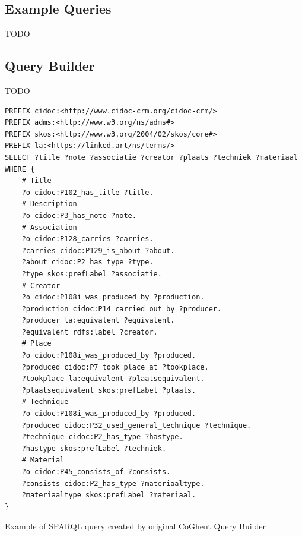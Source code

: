 \subsection{Example Queries}
\label{sec:coghent_example_queries}

TODO

\subsection{Query Builder}

TODO

\begin{listing}[htbp]
    \begin{verbatim}
PREFIX cidoc:<http://www.cidoc-crm.org/cidoc-crm/>
PREFIX adms:<http://www.w3.org/ns/adms#>
PREFIX skos:<http://www.w3.org/2004/02/skos/core#>
PREFIX la:<https://linked.art/ns/terms/>
SELECT ?title ?note ?associatie ?creator ?plaats ?techniek ?materiaal
WHERE {
    # Title
    ?o cidoc:P102_has_title ?title.
    # Description
    ?o cidoc:P3_has_note ?note.
    # Association
    ?o cidoc:P128_carries ?carries.
    ?carries cidoc:P129_is_about ?about.
    ?about cidoc:P2_has_type ?type.
    ?type skos:prefLabel ?associatie.
    # Creator
    ?o cidoc:P108i_was_produced_by ?production.
    ?production cidoc:P14_carried_out_by ?producer.
    ?producer la:equivalent ?equivalent.
    ?equivalent rdfs:label ?creator.
    # Place
    ?o cidoc:P108i_was_produced_by ?produced.
    ?produced cidoc:P7_took_place_at ?tookplace.
    ?tookplace la:equivalent ?plaatsequivalent.
    ?plaatsequivalent skos:prefLabel ?plaats.
    # Technique
    ?o cidoc:P108i_was_produced_by ?produced.
    ?produced cidoc:P32_used_general_technique ?technique.
    ?technique cidoc:P2_has_type ?hastype.
    ?hastype skos:prefLabel ?techniek.
    # Material
    ?o cidoc:P45_consists_of ?consists.
    ?consists cidoc:P2_has_type ?materiaaltype.
    ?materiaaltype skos:prefLabel ?materiaal.
}
    \end{verbatim}
    \caption{Example of SPARQL query created by original CoGhent Query Builder}
    \label{lst:coghent_builder_original}
\end{listing}